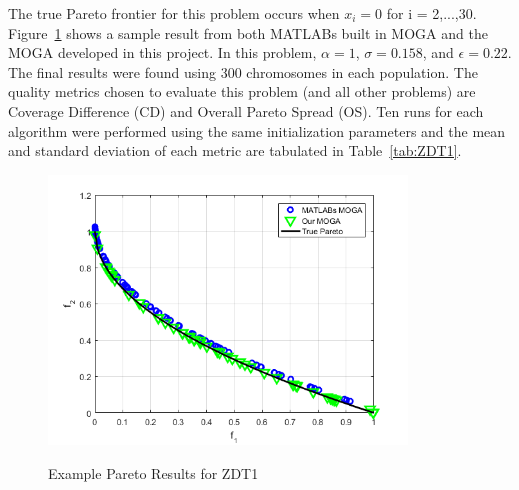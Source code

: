 \documentclass{article}
\begin{document}
\noindent The true Pareto frontier for this problem occurs when $x_i = 0$ for i = 2,...,30. Figure~\ref{fig:ZDT1} shows a sample result from both MATLABs built in MOGA and the MOGA developed in this project. In this problem, $\alpha=1$, $\sigma = 0.158$, and $\epsilon = 0.22$. The final results were found using 300 chromosomes in each population. The quality metrics chosen to evaluate this problem (and all other problems) are Coverage Difference (CD) and Overall Pareto Spread (OS). Ten runs for each algorithm were performed using the same initialization parameters and the mean and standard deviation of each metric are tabulated in Table~\ref{tab:ZDT1}.


\begin{figure}[H]
  \caption{Example Pareto Results for ZDT1}
  \centering
  \includegraphics[width=0.85\textwidth]{ZDT1_pareto_final.png}  
  \label{fig:ZDT1}
\end{figure}
\end{document}
